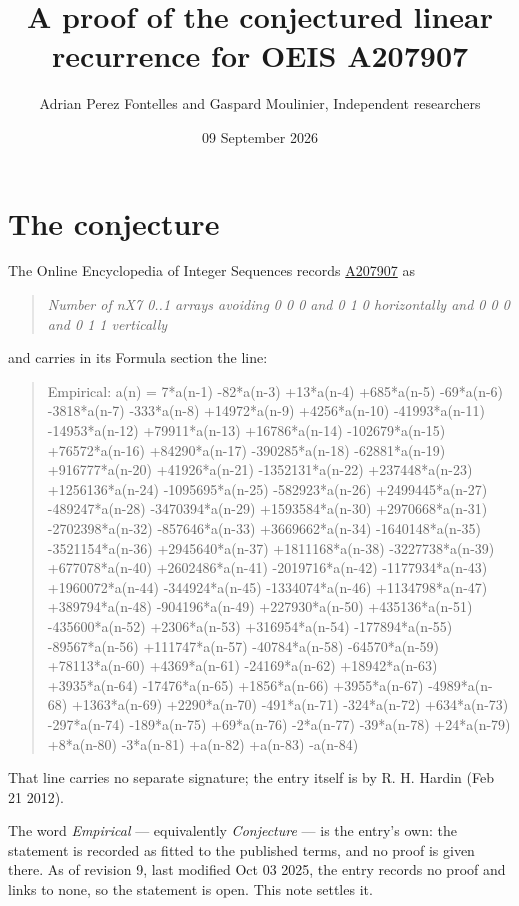 \documentclass[11pt]{article}
\title{A proof of the conjectured linear recurrence for OEIS A207907}
\author{Adrian Perez Fontelles and Gaspard Moulinier, Independent researchers}
\date{09 September 2026}
\theoremstyle{definition}
\begin{document}
\maketitle
\section{The conjecture}

The Online Encyclopedia of Integer Sequences records \href{https://oeis.org/A207907}{A207907} as

\begin{quote}\itshape Number of nX7 0..1 arrays avoiding 0 0 0 and 0 1 0 horizontally and 0 0 0 and 0 1 1 vertically\end{quote}

and carries in its Formula section the line:

\begin{quote}\ttfamily Empirical: a(n) = 7*a(n-1) -82*a(n-3) +13*a(n-4) +685*a(n-5) -69*a(n-6) -3818*a(n-7) -333*a(n-8) +14972*a(n-9) +4256*a(n-10) -41993*a(n-11) -14953*a(n-12) +79911*a(n-13) +16786*a(n-14) -102679*a(n-15) +76572*a(n-16) +84290*a(n-17) -390285*a(n-18) -62881*a(n-19) +916777*a(n-20) +41926*a(n-21) -1352131*a(n-22) +237448*a(n-23) +1256136*a(n-24) -1095695*a(n-25) -582923*a(n-26) +2499445*a(n-27) -489247*a(n-28) -3470394*a(n-29) +1593584*a(n-30) +2970668*a(n-31) -2702398*a(n-32) -857646*a(n-33) +3669662*a(n-34) -1640148*a(n-35) -3521154*a(n-36) +2945640*a(n-37) +1811168*a(n-38) -3227738*a(n-39) +677078*a(n-40) +2602486*a(n-41) -2019716*a(n-42) -1177934*a(n-43) +1960072*a(n-44) -344924*a(n-45) -1334074*a(n-46) +1134798*a(n-47) +389794*a(n-48) -904196*a(n-49) +227930*a(n-50) +435136*a(n-51) -435600*a(n-52) +2306*a(n-53) +316954*a(n-54) -177894*a(n-55) -89567*a(n-56) +111747*a(n-57) -40784*a(n-58) -64570*a(n-59) +78113*a(n-60) +4369*a(n-61) -24169*a(n-62) +18942*a(n-63) +3935*a(n-64) -17476*a(n-65) +1856*a(n-66) +3955*a(n-67) -4989*a(n-68) +1363*a(n-69) +2290*a(n-70) -491*a(n-71) -324*a(n-72) +634*a(n-73) -297*a(n-74) -189*a(n-75) +69*a(n-76) -2*a(n-77) -39*a(n-78) +24*a(n-79) +8*a(n-80) -3*a(n-81) +a(n-82) +a(n-83) -a(n-84)\end{quote}

That line carries no separate signature; the entry itself is by R. H. Hardin (Feb 21 2012).

The word {\itshape Empirical} --- equivalently {\itshape Conjecture} --- is the entry's own: the statement is recorded as fitted to the published terms, and no proof is given there. As of revision 9, last modified Oct 03 2025, the entry records no proof and links to none, so the statement is open. This note settles it.
\end{document}
